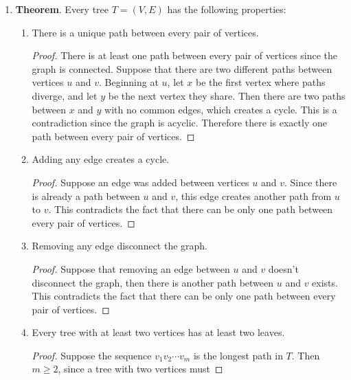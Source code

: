 \documentclass[11pt]{article}
\begin{document}
\begin{enumerate}
\begin{proof}
      \begin{equation}
        M_{iv_1}^{k}M_{v_1j} + M_{iv_2}^{k}M_{v_2j} + \cdots +
        M_{iv_n}^{k}M_{v_nj} 
      \end{equation}
      This is exactly $M_{ij}^{k+1}$, thus $P(k+1)$ also holds. The
      theorem follows by induction.
    \end{proof}

  \item
    \textbf{Theorem}. Every tree $T=(V,E)$ has the following
    properties:
    \begin{enumerate}
    \item There is a unique path between every pair of vertices.
      \begin{proof}
        There is at least one path between every pair of vertices
        since the graph is connected. Suppose that there are two
        different paths between vertices $u$ and $v$. Beginning at
        $u$, let $x$ be the first vertex where paths diverge, and let
        $y$ be the next vertex they share. Then there are two paths
        between $x$ and $y$ with no common edges, which creates a
        cycle. This is a contradiction since the graph is
        acyclic. Therefore there is exactly one path between every
        pair of vertices.
      \end{proof}
    \item Adding any edge creates a cycle.
      \begin{proof}
        Suppose an edge was added between vertices $u$ and $v$. Since
        there is already a path between $u$ and $v$, this edge creates
        another path from $u$ to $v$. This contradicts the fact that
        there can be only one path between every pair of vertices.
      \end{proof}
    \item Removing any edge disconnect the graph.
      \begin{proof}
        Suppose that removing an edge between $u$ and $v$ doesn't
        disconnect the graph, then there is another path between $u$
        and $v$ exists. This contradicts the fact that
        there can be only one path between every pair of vertices.
      \end{proof}
    \item Every tree with at least two vertices has at least two
      leaves.
      \begin{proof}
        Suppose the sequence $v_1v_2 \cdots v_m$ is the longest path in
        $T$. Then $m \geq 2$, since a tree with two vertices must

\end{proof}
\end{enumerate}
\end{enumerate}
\end{document}
